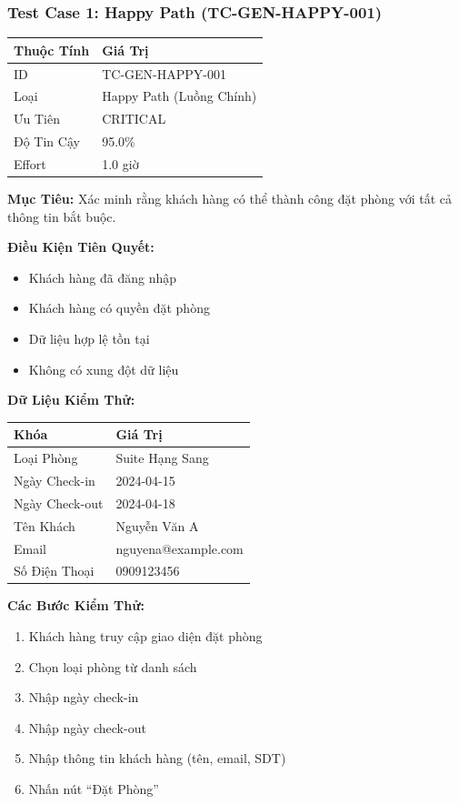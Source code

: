 \documentclass[12pt, a4paper]{article}
\begin{document}
\subsubsection{Test Case 1: Happy Path (TC-GEN-HAPPY-001)}

\begin{table}[h]
\centering
\begin{tabular}{|l|p{8cm}|}
\hline
\textbf{Thuộc Tính} & \textbf{Giá Trị} \\
\hline
ID & TC-GEN-HAPPY-001 \\
Loại & Happy Path (Luồng Chính) \\
Ưu Tiên & CRITICAL \\
Độ Tin Cậy & 95.0\% \\
Effort & 1.0 giờ \\
\hline
\end{tabular}
\end{table}

\textbf{Mục Tiêu:}
Xác minh rằng khách hàng có thể thành công đặt phòng với tất cả thông tin bắt buộc.

\textbf{Điều Kiện Tiên Quyết:}
\begin{itemize}
    \item Khách hàng đã đăng nhập
    \item Khách hàng có quyền đặt phòng
    \item Dữ liệu hợp lệ tồn tại
    \item Không có xung đột dữ liệu
\end{itemize}

\textbf{Dữ Liệu Kiểm Thử:}
\begin{table}[h]
\centering
\begin{tabular}{|l|l|}
\hline
\textbf{Khóa} & \textbf{Giá Trị} \\
\hline
Loại Phòng & Suite Hạng Sang \\
Ngày Check-in & 2024-04-15 \\
Ngày Check-out & 2024-04-18 \\
Tên Khách & Nguyễn Văn A \\
Email & nguyena@example.com \\
Số Điện Thoại & 0909123456 \\
\hline
\end{tabular}
\end{table}

\textbf{Các Bước Kiểm Thử:}
\begin{enumerate}
    \item Khách hàng truy cập giao diện đặt phòng
    \item Chọn loại phòng từ danh sách
    \item Nhập ngày check-in
    \item Nhập ngày check-out
    \item Nhập thông tin khách hàng (tên, email, SDT)
    \item Nhấn nút ``Đặt Phòng''
\end{enumerate}
\end{document}
